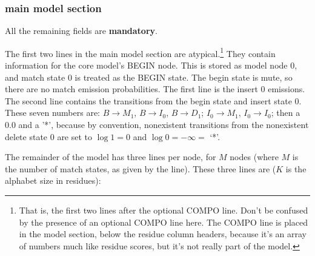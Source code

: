\subsubsection{main model section}

All the remaining fields are \textbf{mandatory}.

The first two lines in the main model section are
atypical.\footnote{That is, the first two lines after the optional
  COMPO line. Don't be confused by the presence of an optional COMPO
  line here. The COMPO line is placed in the model section, below the
  residue column headers, because it's an array of numbers much like
  residue scores, but it's not really part of the model.}  They
contain information for the core model's BEGIN node. This is stored as
model node 0, and match state 0 is treated as the BEGIN state.  The
begin state is mute, so there are no match emission probabilities. The
first line is the insert 0 emissions. The second line contains the
transitions from the begin state and insert state 0.  These seven
numbers are: $B \rightarrow M_1$, $B \rightarrow I_0$, $B \rightarrow
D_1$; $I_0 \rightarrow M_1$, $I_0 \rightarrow I_0$; then a 0.0 and a
'*', because by convention, nonexistent transitions from the
nonexistent delete state 0 are set to $\log 1 = 0$ and $\log 0 =
-\infty = $ `*'.

The remainder of the model has three lines per node, for $M$ nodes
(where $M$ is the number of match states, as given by the 
line). These three lines are ($K$ is the alphabet size in residues):

